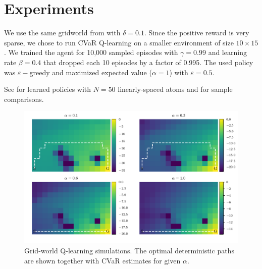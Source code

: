 
%    
%		
%	


\newpage

\section{Experiments}\label{sec:qexperiments}
We use the same gridworld from  with $\delta=0.1$. Since the positive reward is very sparse, we chose to run CVaR Q-learning on a smaller environment of size $10\times15$. We trained the agent for 10,000 sampled episodes with $\gamma=0.99$ and learning rate $\beta=0.4$ that dropped each 10 episodes by a factor of 0.995. The used policy was $\varepsilon-$greedy and maximized expected value ($\alpha=1$) with $\varepsilon=0.5$.

See  for learned policies with $N=50$ linearly-spaced atoms and  for sample comparisons.

\begin{figure}[h]
\center
\includegraphics[width=\linewidth]{gfx/q_optimal_paths.pdf}
\caption{Grid-world Q-learning simulations. The optimal deterministic paths are shown together with CVaR estimates for given $\alpha$.}
\label{fig:qgrid}
\end{figure}


